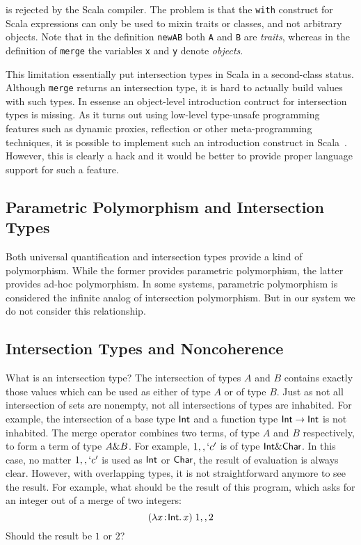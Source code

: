 \noindent is rejected by the Scala compiler. The problem is that the
\lstinline{with} construct for Scala expressions can only be used to
mixin traits or classes, and not arbitrary objects. Note that in the
definition \lstinline{newAB} both \lstinline{A} and \lstinline{B} are
\emph{traits}, whereas in the definition of \lstinline{merge} the variables
\lstinline{x} and \lstinline{y} denote \emph{objects}.

This limitation essentially put intersection types in Scala in a second-class
status. Although \lstinline{merge} returns an intersection type, it is
hard to actually build values with such types. In essense an
object-level introduction contruct for intersection types is missing.
As it turns out using low-level type-unsafe programming features such
as dynamic proxies, reflection or other meta-programming techniques,
it is possible to implement such an introduction
construct in Scala~\cite{oliveira2013feature,rendel14attributes}. However, this
is clearly a hack and it would be better to provide proper language
support for such a feature.

\subsection{Parametric Polymorphism and Intersection Types}

Both universal quantification and intersection types provide a kind of
polymorphism. While the former provides parametric polymorphism, the latter
provides ad-hoc polymorphism. In some systems, parametric polymorphism is
considered the infinite analog of intersection polymorphism. But in our system
we do not consider this relationship. 


\subsection{Intersection Types and Noncoherence}

What is an intersection type? The intersection of types $A$ and $B$ contains
exactly those values which can be used as either of type $A$ or of type $B$.
Just as not all intersection of sets are nonempty, not all intersections of types are inhabited.
For example, the intersection of a base type $\textsf{Int}$ and a function type $\textsf{Int} \to \textsf{Int}$ is not inhabited.
The merge operator combines two terms, of type $A$ and $B$
respectively, to form a term of type $A \& B$. For example, $1 ,,
`c'$ is of type $\textsf{Int} \& \textsf{Char}$. In this case, no matter $1 ,,
`c'$ is used as $\textsf{Int}$ or $\textsf{Char}$, the result of evaluation is always
clear. However, with overlapping types, it is not straightforward anymore to
see the result. For example, what should be the result of this program, which
asks for an integer out of a merge of two integers:
\[ (\lambda x \!:\! \textsf{Int}.\, x) \; 1 ,, 2 \]
Should the result be $1$ or $2$?

